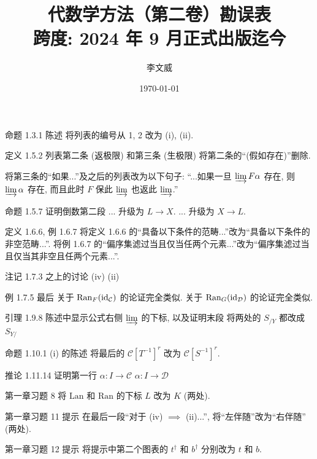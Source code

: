 \documentclass{AJerrata}
\title{\bfseries 代数学方法（第二卷）勘误表 \\ 跨度: 2024 年 9 月正式出版迄今 }
\author{李文威}
\date{\today}
\begin{document}
	\maketitle

	\begin{Errata}
		\item[命题 1.3.1 陈述]
		将列表的编号从 1, 2 改为 (i), (ii).
		
		\item[定义 1.5.2 列表第二条 (返极限) 和第三条 (生极限)]
		将第二条的``(假如存在)''删除.
		
		将第三条的``如果...''及之后的列表改为以下句子: ``...如果一旦 $\varinjlim F\alpha$ 存在, 则 $\varinjlim \alpha$ 存在, 而且此时 $F$ 保此 $\varinjlim$ 也返此 $\varinjlim$.''
		
		\item[命题 1.5.7 证明倒数第二段]
		\Orig ... 升级为 $L \to X$.
		\Corr ... 升级为 $X \to L$.
		
		\item[定义 1.6.6, 例 1.6.7]
		将定义 1.6.6 的``具备以下条件的范畴...''改为``具备以下条件的非空范畴...''. 将例 1.6.7 的``偏序集滤过当且仅当任两个元素...''改为``偏序集滤过当且仅当其非空且任两个元素...''.
		
		\item[注记 1.7.3 之上的讨论]
		\Orig (iv)
		\Corr (ii)
		
		\item[例 1.7.5 最后]
		\Orig 关于 $\operatorname{Ran}_F (\mathrm{id}_{\mathcal{C}})$ 的论证完全类似.
		\Corr 关于 $\operatorname{Ran}_G (\mathrm{id}_{\mathcal{D}})$ 的论证完全类似.
		
		\item[引理 1.9.8 陈述中显示公式右侧 $\varinjlim$ 的下标, 以及证明末段]
		将两处的 $S_{/Y}$ 都改成 $S_{Y/}$
		
		\item[命题 1.10.1 (i) 的陈述]
		将最后的 $\mathcal{C}[T^{-1}]^r$ 改为 $\mathcal{C}[S^{-1}]^r$.
		
		\item[推论 1.11.14 证明第一行]
		\Orig $\alpha: I \to \mathcal{C}$
		\Corr $\alpha: I \to \mathcal{D}$
		
		\item[第一章习题 8]
		将 $\mathrm{Lan}$ 和 $\mathrm{Ran}$ 的下标 $L$ 改为 $K$ (两处).
		
		\item[第一章习题 11 提示] 在最后一段``对于 (iv) $\implies$ (ii)...'', 将``左伴随''改为``右伴随'' (两处).
		
		\item[第一章习题 12 提示] 将提示中第二个图表的 $t^\dagger$ 和 $b^\dagger$ 分别改为 $t$ 和 $b$.
		

\end{Errata}
\end{document}
